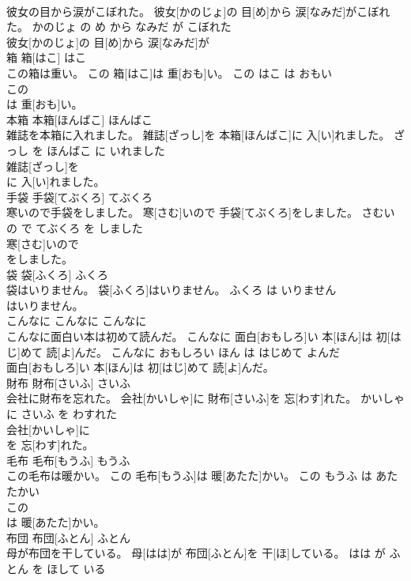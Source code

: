 \documentclass[8pt]{extreport}
\begin{document}
\begin{CJK}{UTF8}{min}
\\	彼女の目から涙がこぼれた。	彼女[かのじょ]の 目[め]から 涙[なみだ]がこぼれた。	かのじょ の め から なみだ が こぼれた	
\\	彼女[かのじょ]の 目[め]から 涙[なみだ]が
\\	箱	箱[はこ]	はこ	
\\	この箱は重い。	この 箱[はこ]は 重[おも]い。	この はこ は おもい	
\\	この
\\	は 重[おも]い。			
\\	本箱	本箱[ほんばこ]	ほんばこ	
\\	雑誌を本箱に入れました。	雑誌[ざっし]を 本箱[ほんばこ]に 入[い]れました。	ざっし を ほんばこ に いれました	
\\	雑誌[ざっし]を
\\	に 入[い]れました。			
\\	手袋	手袋[てぶくろ]	てぶくろ	
\\	寒いので手袋をしました。	寒[さむ]いので 手袋[てぶくろ]をしました。	さむい の で てぶくろ を しました	
\\	寒[さむ]いので
\\	をしました。			
\\	袋	袋[ふくろ]	ふくろ	
\\	袋はいりません。	袋[ふくろ]はいりません。	ふくろ は いりません	
\\	はいりません。			
\\	こんなに	こんなに	こんなに	
\\	こんなに面白い本は初めて読んだ。	こんなに 面白[おもしろ]い 本[ほん]は 初[はじ]めて 読[よ]んだ。	こんなに おもしろい ほん は はじめて よんだ	
\\	面白[おもしろ]い 本[ほん]は 初[はじ]めて 読[よ]んだ。			
\\	財布	財布[さいふ]	さいふ	
\\	会社に財布を忘れた。	会社[かいしゃ]に 財布[さいふ]を 忘[わす]れた。	かいしゃ に さいふ を わすれた	
\\	会社[かいしゃ]に
\\	を 忘[わす]れた。			
\\	毛布	毛布[もうふ]	もうふ	
\\	この毛布は暖かい。	この 毛布[もうふ]は 暖[あたた]かい。	この もうふ は あたたかい	
\\	この
\\	は 暖[あたた]かい。			
\\	布団	布団[ふとん]	ふとん	
\\	母が布団を干している。	母[はは]が 布団[ふとん]を 干[ほ]している。	はは が ふとん を ほして いる	

\end{CJK}
\end{document}
